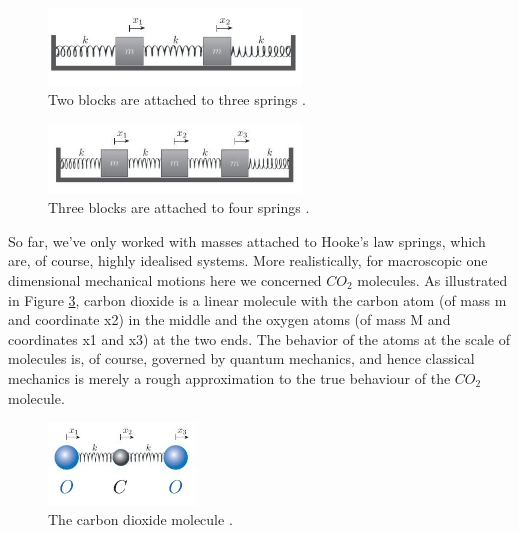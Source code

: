  \begin{figure}[hbt!]
	\centering
	\begin{framed}
	\includegraphics[width=0.6\textwidth]{Figures/A.JPG}
	\end{framed}
	\caption{Two blocks are attached to three springs \cite{Departme83:online}.}
	\label{fig:1}
\end{figure}

 \begin{figure}[hbt!]
	\centering
	\begin{framed}
	\includegraphics[width=0.6\textwidth]{Figures/E.JPG}
	\end{framed}
	\caption{Three blocks are attached to four springs \cite{Departme83:online}.}
	\label{fig:5}
\end{figure}

So far, we've only worked with masses attached to Hooke's law springs, which are, of course, highly idealised systems. More realistically, for macroscopic one dimensional mechanical motions here we concerned $CO_2$ molecules. As illustrated in Figure \ref{fig:4}, carbon dioxide is a linear molecule with the carbon atom (of mass m and coordinate x2) in the middle and the oxygen atoms (of mass M and coordinates x1 and x3) at the two ends. The behavior of the atoms at the scale of molecules is, of course, governed by quantum mechanics, and hence classical mechanics is merely a rough approximation to the true behaviour of the $CO_2$ molecule.

 \begin{figure}[hbt!]
	\centering
	\begin{framed}
	\includegraphics[width=0.35\textwidth]{Figures/D.JPG}
		\end{framed}
	\caption{The carbon dioxide molecule \cite{Departme83:online}.}
	\label{fig:4}
\end{figure}

